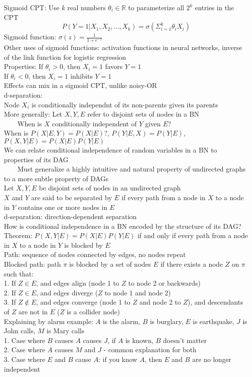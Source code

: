 \documentclass[10pt,letterpaper,unboxed,cm]{article}
\newcommand{\tab}{~~~~}
\begin{document}
Sigmoid CPT: Use $k$ real numbers $\theta_i \in \mathbb{R}$ to parameterize all $2^k$ entries in the CPT\\
$$P(Y = 1|X_1, X_2, \ldots, X_k) = \sigma(\Sigma^k_{i=1}\theta_iX_i)$$
Sigmoid function: $\sigma(z) = \frac{1}{1 + e^{-z}}$\\
Other uses of sigmoid functions: activation functions in neural networks, inverse of the link function for logistic regression\\
Properties: If $\theta_i > 0$, then $X_i = 1$ favors $Y = 1$\\
If $\theta_i < 0$, then $X_i = 1$ inhibits $Y = 1$\\
Effects can mix in a sigmoid CPT, unlike noisy-OR\\
d-separation:\\
Node $X_i$ is conditionally independnt of its non-parents given its parents\\
More generally: Let $X, Y, E$ refer to disjoint sets of nodes in a BN\\
\tab When is $X$ conditionally independent of $Y$ given $E$?\\
When is $P(X|E,Y) = P(X|E)$?, $P(Y|E,X) = P(Y|E)$, $P(X,Y|E) = P(X|E)P(Y|E)$\\
We can relate conditional independence of random variables in a BN to properties of its DAG\\
\tab Must generalize a highly intuitive and natural property of undirected graphs to a more subtle property of DAGs\\
Let $X, Y, E$ be disjoint sets of nodes in an undirected graph\\
$X$ and $Y$ are said to be separated by $E$ if every path from a node in $X$ to a node in $Y$ contains one or more nodes in $E$\\
d-separation: direction-dependent separation\\
How is conditional independence in a BN encoded by the structure of its DAG?\\
Theorem: $P(X,Y|E) = P(X|E)P(Y|E)$ if and only if every path from a node in $X$ to a node in $Y$ is blocked by $E$\\
Path: sequence of nodes connected by edges, no nodes repeat\\
Blocked path: path $\pi$ is blocked by a set of nodes $E$ if there exists a node $Z$ on $\pi$ such that:\\
1. If $Z \in E$, and edges align (node 1 to $Z$ to node 2 or backwards)\\
2. If $Z \in E$, and edges diverge ($Z$ to node 1 and node 2)\\
3. If $Z \notin E$, and edges converge (node 1 to $Z$ and node 2 to $Z$), and descendants of $Z$ are not in $E$ ($Z$ is a collider node)\\
Explaining by alarm example: $A$ is the alarm, $B$ is burglary, $E$ is earthquake, $J$ is John calls, $M$ is Mary calls\\
1. Case where $B$ causes $A$ causes $J$, if $A$ is known, $B$ doesn't matter\\
2. Case where $A$ causes $M$ and $J$ - common explanation for both\\
3. Case where $E$ and $B$ cause $A$: if you know $A$, then $E$ and $B$ are no longer independent\\
\end{document}
